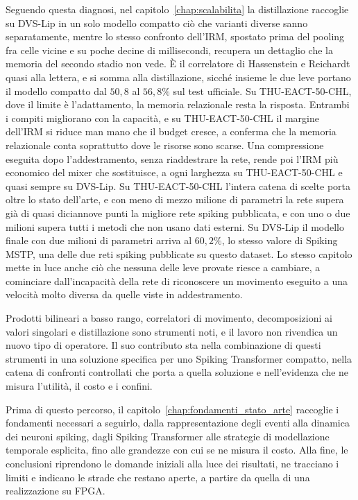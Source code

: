 Seguendo questa diagnosi, nel capitolo~\ref{chap:scalabilita} la distillazione raccoglie su DVS-Lip in un solo modello compatto ciò che varianti diverse sanno separatamente, mentre lo stesso confronto dell'IRM, spostato prima del pooling fra celle vicine e su poche decine di millisecondi, recupera un dettaglio che la memoria del secondo stadio non vede. È il correlatore di Hassenstein e Reichardt quasi alla lettera, e si somma alla distillazione, sicché insieme le due leve portano il modello compatto dal $50{,}8$ al $56{,}8\%$ sul test ufficiale. Su THU-EACT-50-CHL, dove il limite è l'adattamento, la memoria relazionale resta la risposta. Entrambi i compiti migliorano con la capacità, e su THU-EACT-50-CHL il margine dell'IRM si riduce man mano che il budget cresce, a conferma che la memoria relazionale conta soprattutto dove le risorse sono scarse. Una compressione eseguita dopo l'addestramento, senza riaddestrare la rete, rende poi l'IRM più economico del mixer che sostituisce, a ogni larghezza su THU-EACT-50-CHL e quasi sempre su DVS-Lip. Su THU-EACT-50-CHL l'intera catena di scelte porta oltre lo stato dell'arte, e con meno di mezzo milione di parametri la rete supera già di quasi diciannove punti la migliore rete spiking pubblicata, e con uno o due milioni supera tutti i metodi che non usano dati esterni. Su DVS-Lip il modello finale con due milioni di parametri arriva al $60{,}2\%$, lo stesso valore di Spiking MSTP, una delle due reti spiking pubblicate su questo dataset. Lo stesso capitolo mette in luce anche ciò che nessuna delle leve provate riesce a cambiare, a cominciare dall'incapacità della rete di riconoscere un movimento eseguito a una velocità molto diversa da quelle viste in addestramento.

Prodotti bilineari a basso rango, correlatori di movimento, decomposizioni ai valori singolari e distillazione sono strumenti noti, e il lavoro non rivendica un nuovo tipo di operatore. Il suo contributo sta nella combinazione di questi strumenti in una soluzione specifica per uno Spiking Transformer compatto, nella catena di confronti controllati che porta a quella soluzione e nell'evidenza che ne misura l'utilità, il costo e i confini.

Prima di questo percorso, il capitolo~\ref{chap:fondamenti_stato_arte} raccoglie i fondamenti necessari a seguirlo, dalla rappresentazione degli eventi alla dinamica dei neuroni spiking, dagli Spiking Transformer alle strategie di modellazione temporale esplicita, fino alle grandezze con cui se ne misura il costo. Alla fine, le conclusioni riprendono le domande iniziali alla luce dei risultati, ne tracciano i limiti e indicano le strade che restano aperte, a partire da quella di una realizzazione su FPGA.
